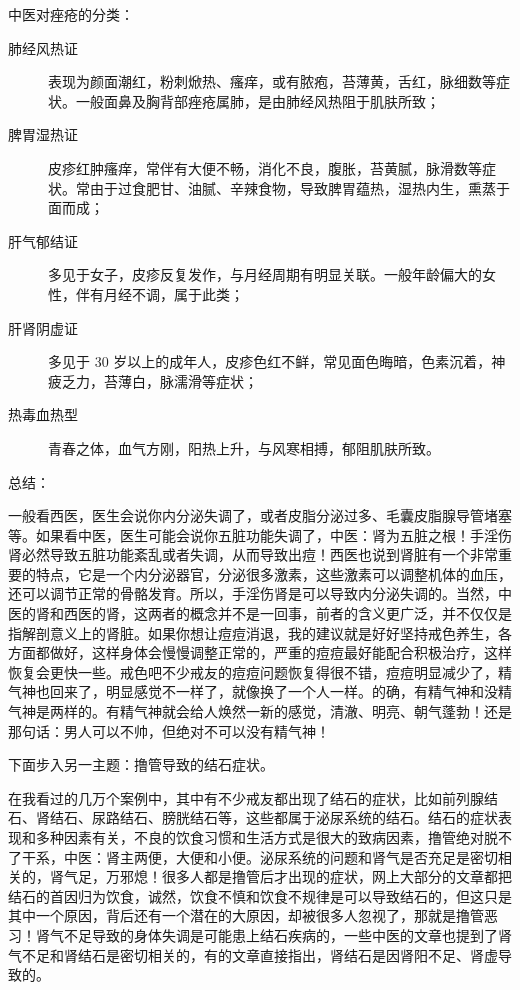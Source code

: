 \documentclass{ctexart}
\begin{document}
中医对痤疮的分类：
\begin{description}
    \item[肺经风热证] 表现为颜面潮红，粉刺焮热、瘙痒，或有脓疱，苔薄黄，舌红，脉细数等症状。一般面鼻及胸背部痤疮属肺，是由肺经风热阻于肌肤所致；
    \item[脾胃湿热证] 皮疹红肿瘙痒，常伴有大便不畅，消化不良，腹胀，苔黄腻，脉滑数等症状。常由于过食肥甘、油腻、辛辣食物，导致脾胃蕴热，湿热内生，熏蒸于面而成；
    \item[肝气郁结证] 多见于女子，皮疹反复发作，与月经周期有明显关联。一般年龄偏大的女性，伴有月经不调，属于此类；
    \item[肝肾阴虚证] 多见于 30 岁以上的成年人，皮疹色红不鲜，常见面色晦暗，色素沉着，神疲乏力，苔薄白，脉濡滑等症状；
    \item[热毒血热型] 青春之体，血气方刚，阳热上升，与风寒相搏，郁阻肌肤所致。
\end{description}

总结：

一般看西医，医生会说你内分泌失调了，或者皮脂分泌过多、毛囊皮脂腺导管堵塞等。如果看中医，医生可能会说你五脏功能失调了，中医：肾为五脏之根！手淫伤肾必然导致五脏功能紊乱或者失调，从而导致出痘！西医也说到肾脏有一个非常重要的特点，它是一个内分泌器官，分泌很多激素，这些激素可以调整机体的血压，还可以调节正常的骨骼发育。所以，手淫伤肾是可以导致内分泌失调的。当然，中医的肾和西医的肾，这两者的概念并不是一回事，前者的含义更广泛，并不仅仅是指解剖意义上的肾脏。如果你想让痘痘消退，我的建议就是好好坚持戒色养生，各方面都做好，这样身体会慢慢调整正常的，严重的痘痘最好能配合积极治疗，这样恢复会更快一些。戒色吧不少戒友的痘痘问题恢复得很不错，痘痘明显减少了，精气神也回来了，明显感觉不一样了，就像换了一个人一样。的确，有精气神和没精气神是两样的。有精气神就会给人焕然一新的感觉，清澈、明亮、朝气蓬勃！还是那句话：男人可以不帅，但绝对不可以没有精气神！

下面步入另一主题：撸管导致的结石症状。

在我看过的几万个案例中，其中有不少戒友都出现了结石的症状，比如前列腺结石、肾结石、尿路结石、膀胱结石等，这些都属于泌尿系统的结石。结石的症状表现和多种因素有关，不良的饮食习惯和生活方式是很大的致病因素，撸管绝对脱不了干系，中医：肾主两便，大便和小便。泌尿系统的问题和肾气是否充足是密切相关的，肾气足，万邪熄！很多人都是撸管后才出现的症状，网上大部分的文章都把结石的首因归为饮食，诚然，饮食不慎和饮食不规律是可以导致结石的，但这只是其中一个原因，背后还有一个潜在的大原因，却被很多人忽视了，那就是撸管恶习！肾气不足导致的身体失调是可能患上结石疾病的，一些中医的文章也提到了肾气不足和肾结石是密切相关的，有的文章直接指出，肾结石是因肾阳不足、肾虚导致的。
\end{document}
